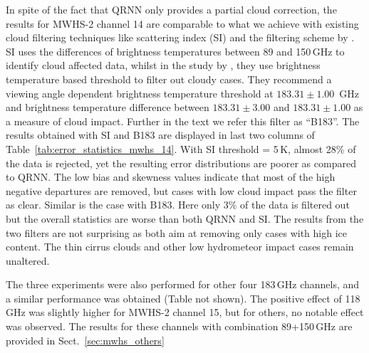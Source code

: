 \documentclass[amt, manuscript]{copernicus}
\begin{document}
In spite of the fact that QRNN only provides a partial cloud correction, the results for  MWHS-2 channel 14 are comparable to what we achieve with existing cloud filtering techniques like scattering index (SI) and the filtering scheme by \citet{buehler:aclou:07}. SI uses the differences of brightness temperatures between 89 and 150\,GHz to identify cloud affected data, whilst in the study by \citet{buehler:aclou:07}, they use brightness temperature based threshold to filter out cloudy cases. They recommend a viewing angle dependent brightness temperature threshold at $183.31\pm1.00$ \,GHz and brightness temperature difference between $183.31\pm3.00$ and $183.31\pm 1.00$ as a measure of cloud impact. Further in the text we refer this filter as ``B183''. The results obtained with SI and B183 are displayed in last two columns of Table~\ref{tab:error_statistics_mwhs_14}. With SI threshold = 5\,K, almost 28\% of the data is rejected, yet the resulting error distributions are poorer as compared to QRNN. The low bias and skewness values indicate that most of the high negative departures are removed, but cases with low cloud impact pass the filter as clear. Similar is the case with B183. Here only 3\% of the data is filtered out but the overall statistics are worse than both QRNN and SI. The results from the two filters are not surprising as both aim at removing only cases with high ice content. The thin cirrus clouds and other low hydrometeor impact cases remain unaltered.

The three experiments were also performed for other four 183\,GHz channels, and a similar performance was obtained (Table not shown). The positive effect of 118\,GHz was slightly higher for MWHS-2 channel 15, but for others, no notable effect was observed. The results for these channels with combination 89+150\,GHz are provided in Sect.~\ref{sec:mwhs_others} 
\end{document}
